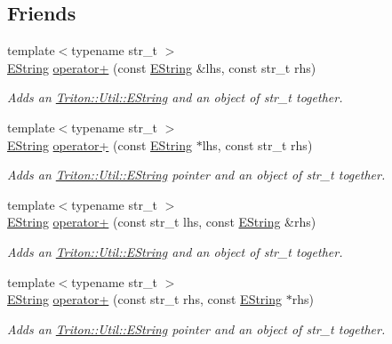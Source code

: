 \subsection*{Friends}
\begin{DoxyCompactItemize}
\item 
{\footnotesize template$<$typename str\+\_\+t $>$ }\\\hyperlink{class_triton_1_1_util_1_1_e_string}{E\+String} \hyperlink{class_triton_1_1_util_1_1_e_string_a311704c9403a7dfef4188cc6ce6435b6}{operator+} (const \hyperlink{class_triton_1_1_util_1_1_e_string}{E\+String} \&lhs, const str\+\_\+t rhs)
\begin{DoxyCompactList}\small\item\em Adds an \hyperlink{class_triton_1_1_util_1_1_e_string}{Triton\+::\+Util\+::\+E\+String} and an object of str\+\_\+t together. \end{DoxyCompactList}\item 
{\footnotesize template$<$typename str\+\_\+t $>$ }\\\hyperlink{class_triton_1_1_util_1_1_e_string}{E\+String} \hyperlink{class_triton_1_1_util_1_1_e_string_ab95abe4b8528e9e020c22bb750764f1b}{operator+} (const \hyperlink{class_triton_1_1_util_1_1_e_string}{E\+String} $\ast$lhs, const str\+\_\+t rhs)
\begin{DoxyCompactList}\small\item\em Adds an \hyperlink{class_triton_1_1_util_1_1_e_string}{Triton\+::\+Util\+::\+E\+String} pointer and an object of str\+\_\+t together. \end{DoxyCompactList}\item 
{\footnotesize template$<$typename str\+\_\+t $>$ }\\\hyperlink{class_triton_1_1_util_1_1_e_string}{E\+String} \hyperlink{class_triton_1_1_util_1_1_e_string_a0b480a35046f6e64ed031d56f7983000}{operator+} (const str\+\_\+t lhs, const \hyperlink{class_triton_1_1_util_1_1_e_string}{E\+String} \&rhs)
\begin{DoxyCompactList}\small\item\em Adds an \hyperlink{class_triton_1_1_util_1_1_e_string}{Triton\+::\+Util\+::\+E\+String} and an object of str\+\_\+t together. \end{DoxyCompactList}\item 
{\footnotesize template$<$typename str\+\_\+t $>$ }\\\hyperlink{class_triton_1_1_util_1_1_e_string}{E\+String} \hyperlink{class_triton_1_1_util_1_1_e_string_ad1f234e12a57914ad8d2a6cab6e13342}{operator+} (const str\+\_\+t rhs, const \hyperlink{class_triton_1_1_util_1_1_e_string}{E\+String} $\ast$rhs)
\begin{DoxyCompactList}\small\item\em Adds an \hyperlink{class_triton_1_1_util_1_1_e_string}{Triton\+::\+Util\+::\+E\+String} pointer and an object of str\+\_\+t together. \end{DoxyCompactList}\end{DoxyCompactItemize}


